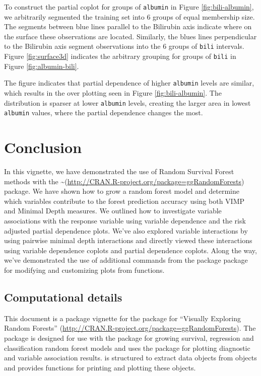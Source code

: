 \documentclass[article, nojss]{jss}
\begin{document}
To construct the partial coplot for groups of \texttt{albumin} in Figure
\ref{fig:bili-albumin}, we arbitrarily segmented the training set into 6
groups of equal membership size. The segments between blue lines
parallel to the Bilirubin axis indicate where on the surface these
observations are located. Similarly, the blues lines perpendicular to
the Bilirubin axis segment observations into the 6 groups of
\texttt{bili} intervals. Figure \ref{fig:surface3d} indicates the
arbitrary grouping for groups of \texttt{bili} in Figure
\ref{fig:albumin-bili}.

The figure indicates that partial dependence of higher \texttt{albumin}
levels are similar, which results in the over plotting seen in Figure
\ref{fig:bili-albumin}. The distribution is sparser at lower
\texttt{albumin} levels, creating the larger area in lowest
\texttt{albumin} values, where the partial dependence changes the most.

\section{Conclusion}\label{conclusion}

In this vignette, we have demonstrated the use of Random Survival Forest
methods with the
\textasciitilde{}(\url{http://CRAN.R-project.org/package=ggRandomForests})
package. We have shown how to grow a random forest model and determine
which variables contribute to the forest prediction accuracy using both
VIMP and Minimal Depth measures. We outlined how to investigate variable
associations with the response variable using variable dependence and
the risk adjusted partial dependence plots. We've also explored variable
interactions by using pairwise minimal depth interactions and directly
viewed these interactions using variable dependence coplots and partial
dependence coplots. Along the way, we've demonstrated the use of
additional commands from the  package
\citep[\url{http://CRAN.R-project.org/package=ggplot2}]{Wickham:2009}
package for modifying and customizing plots from 
functions.

\subsection{Computational details}\label{computational-details}

This document is a package vignette for the 
package for ``Visually Exploring Random Forests''
(\url{http://CRAN.R-project.org/package=ggRandomForests}). The
 package is designed for use with the
 package
\citep[\url{http://CRAN.R-project.org/package=randomForestSRC}]{Ishwaran:RFSRC:2014}
for growing survival, regression and classification random forest models
and uses the  package
\citep[\url{http://CRAN.R-project.org/package=ggplot2}]{Wickham:2009}
for plotting diagnostic and variable association results.
 is structured to extract data objects from
 objects and provides functions for printing and
plotting these objects.
\end{document}

